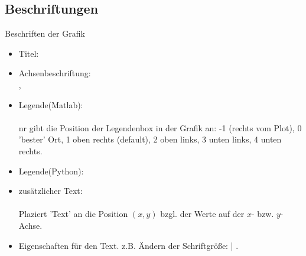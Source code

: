 \documentclass[hyperref={xetex}]{beamer}
\begin{document}
\subsection{Beschriftungen}
% 
% 
\begin{frame}[fragile]{Beschriften der Grafik}
\begin{itemize}
\item Titel: \\ 
\alert{ }
\item Achsenbeschriftung:\\
\alert{ },
  \alert{ } 
\item Legende(Matlab):\\
\alert{ } \\
{\scriptsize \alert{ nr} gibt die Position der Legendenbox in der Grafik an:
  -1 (rechts vom Plot), 0 'bester' Ort, 1 oben rechts (default), 2
  oben links, 3 unten links, 4 unten rechts. }
\item Legende(Python):\\ 
\alert{}
\item zusätzlicher Text:\\ \alert{ }\\ Plaziert
  'Text' an die Position $(x,y)$ bzgl. der Werte auf der $x$-
  bzw. $y$-Achse. 
\item Eigenschaften für den Text. z.B. Ändern der Schriftgröße: | .
\end{itemize}
\end{frame}
% 
% 
\end{document}
